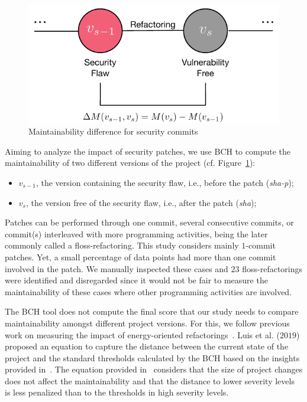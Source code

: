 \documentclass[10pt,conference]{IEEEtran}
\begin{document}
\begin{figure}[h]
 	\centering 	
	\includegraphics[width=0.6\linewidth]{figures/commit.pdf}
 	\caption{Maintainability difference for security commits}
	\label{fig:commit}
\end{figure}

Aiming to analyze the impact of security patches, we use BCH to compute the
maintainability of two different versions of the project (cf. Figure~\ref{fig:commit}):

\begin{itemize}
	\item $v_{s-1}$, the version containing the security flaw, i.e., before the
	patch (\emph{sha-p});
	\item $v_{s}$, the version free of the security flaw, i.e., after the
	patch (\emph{sha});
\end{itemize}

Patches can be performed through one commit, several consecutive commits, or 
commit(s) interleaved with more programming activities, being the later
commonly called a floss-refactoring. This study considers mainly $1$-commit 
patches. Yet, a small percentage of data points had more than one commit 
involved in the patch. We manually inspected these cases and $23$ 
floss-refactorings were identified and disregarded since it would not
be fair to measure the maintainability of these cases where other
programming activities are involved.

The BCH tool does not compute the final score that our study needs to compare
maintainability amongst different project versions. For this, we follow previous 
work on measuring the impact of energy-oriented 
refactorings~\cite{cruz2019energyoriented}. Luis et al. ($2019$) proposed an 
equation to capture the distance between the current state of the project and
the standard thresholds calculated by the BCH based on the insights provided 
in~\cite{Olivari:2018}. The equation provided in~\cite{cruz2019energyoriented} 
considers that the size of project changes does not affect the maintainability 
and that the distance to lower severity levels is less penalized than to the
thresholds in high severity levels.
\end{document}
